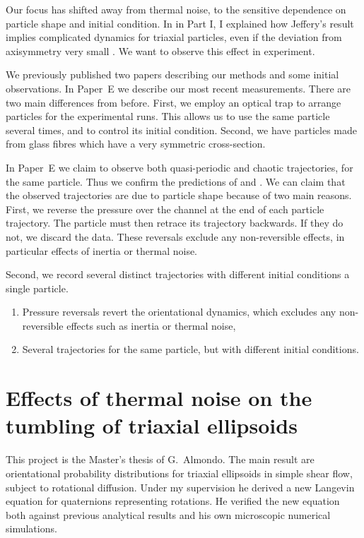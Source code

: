 \documentclass[thesis.tex]{subfiles}
\begin{document}
Our focus has shifted away from thermal noise, to the sensitive dependence on particle shape and initial condition. In  in Part I, I explained how Jeffery's result implies complicated dynamics for triaxial particles, even if the deviation from axisymmetry very small \cite{hinch1979,yarin1997}. We want to observe this effect in experiment.

We previously published two papers \cite{mishra2012,einarsson2013} describing our methods and some initial observations. In Paper~E we describe our most recent measurements. There are two main differences from before. First, we employ an optical trap to arrange particles for the experimental runs. This allows us to use the same particle several times, and to control its initial condition. Second, we have particles made from glass fibres which have a very symmetric cross-section.

In Paper~E we claim to observe both quasi-periodic and chaotic trajectories, for the same particle. Thus we confirm the predictions of \citet{hinch1979} and \citet{yarin1997}. We can claim that the observed trajectories are due to particle shape because of two main reasons. First, we reverse the pressure over the channel at the end of each particle trajectory. The particle must then retrace its trajectory backwards. If they do not, we discard the data. These reversals exclude any non-reversible effects, in particular effects of inertia or thermal noise.

Second, we record several distinct trajectories with different initial conditions a single particle.
\begin{enumerate}
    \item Pressure reversals revert the orientational dynamics, which excludes any non-reversible effects such as inertia or thermal noise,
    \item Several trajectories for the same particle, but with different initial conditions.
\end{enumerate}

\chapter{Effects of thermal noise on the tumbling of triaxial ellipsoids}\label{sec:triaxialnoise}
This project is the Master's thesis of G.~Almondo. The main result are orientational probability distributions for triaxial ellipsoids in simple shear flow, subject to rotational diffusion. Under my supervision he derived a new Langevin equation for quaternions representing rotations. He verified the new equation both against previous analytical results \cite{rallison,brenner} and his own microscopic numerical simulations.
\end{document}
